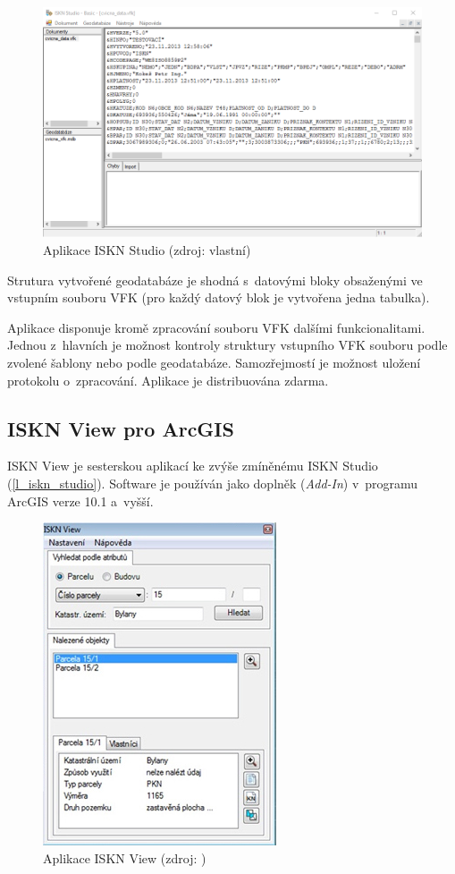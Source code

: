 \documentclass[a4paper,12pt,oneside]{book}
\begin{document}
\begin{figure}[htb]
\centering
\includegraphics[width=.8\textwidth]{images/ISKNStudio-aplikace.png}
\caption[Aplikace ISKN Studio]{Aplikace ISKN Studio (zdroj: vlastní)}
\end{figure}

Strutura vytvořené geodatabáze je shodná s~datovými bloky obsaženými
ve vstupním souboru VFK (pro každý datový blok je vytvořena jedna
tabulka).

Aplikace disponuje kromě zpracování souboru VFK dalšími
funkcionalitami. Jednou z~hlavních je možnost kontroly struktury
vstupního VFK souboru podle zvolené šablony nebo podle
geodatabáze. Samozřejmostí je možnost uložení protokolu
o~zpracování. Aplikace je distribuována zdarma.

\newpage
\subsection{ISKN View pro ArcGIS}
ISKN View je sesterskou aplikací ke zvýše zmíněnému ISKN Studio
(\ref{l_iskn_studio}). Software je používán jako doplněk
(\textit{Add-In}) v~programu ArcGIS verze 10.1 a~vyšší.

\begin{figure}[htb]
\centering
\includegraphics[scale=0.47]{images/ISKNView-aplikace.png}
\caption[Aplikace ISKN View]{Aplikace ISKN View (zdroj: \cite{iskn_studio})}
\end{figure}
\end{document}
